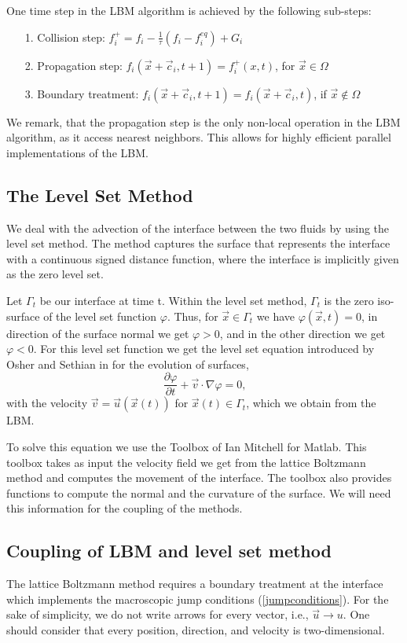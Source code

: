 \documentclass[final,leqno,onefignum,onetabnum]{siamltexmm}
\begin{document}
One time step in the LBM algorithm is achieved by the following sub-steps:
\begin{itemize}
	\item[1. ] Collision step: $f_i^+ = f_i - \frac1\tau(f_i - f_i ^{eq}) + G_i$
	\item[2. ] Propagation step: $f_i(\vec{x}+\vec c_i ,t+1) = f_i^+(x,t)$, for $\vec{x} \in \Omega$
	\item[3. ] Boundary treatment: $f_i(\vec{x}+\vec c_i ,t+1) = f_i(\vec{x}+\vec c_i ,t)$, if $\vec{x} \notin \Omega$
\end{itemize}

We remark, that the propagation step is the only non-local operation in the LBM algorithm, as it access nearest neighbors. This allows for highly efficient parallel implementations of the LBM.
\subsection{The Level Set Method}
We deal with the advection of the interface between the two fluids by using the level set method. The method captures the surface that represents the interface with a continuous signed distance function, where the interface is implicitly given as the zero level set.

Let $\Gamma_t$ be our interface at time t. Within the level set method, $\Gamma_t$ is the zero iso-surface of the level set function $\varphi$. Thus, for $\vec x \in \Gamma_t$ we have $\varphi(\vec x,t) = 0$, in direction of the surface normal we get $\varphi > 0$, and in the other direction we get $\varphi < 0$. For this level set function we get the level set equation introduced by Osher and Sethian in \cite{OsherSethian} for the evolution of surfaces,
\begin{equation}
  \frac{\partial \varphi}{\partial t} + \vec v \cdot \nabla \varphi = 0 \text{,}
\end{equation}
with the velocity $\vec v = \vec u(\vec x(t))$ for $\vec x(t) \in \Gamma_t$, which we obtain from the LBM.

To solve this equation we use the Toolbox of Ian Mitchell \cite{mitchell} for Matlab. This toolbox takes as input the velocity field we get from the lattice Boltzmann method and computes the movement of the interface. The toolbox also provides functions to compute the normal and the curvature of the surface. We will need this information for the coupling of the methods.

\subsection{Coupling of LBM and level set method}
The lattice Boltzmann method requires a boundary treatment at the interface which implements the macroscopic jump conditions (\ref{jumpconditions}). For the sake of simplicity, we do not write arrows for every vector, i.e., $\vec{u} \rightarrow u$. One should consider that every position, direction, and velocity is two-dimensional. 
\end{document}
